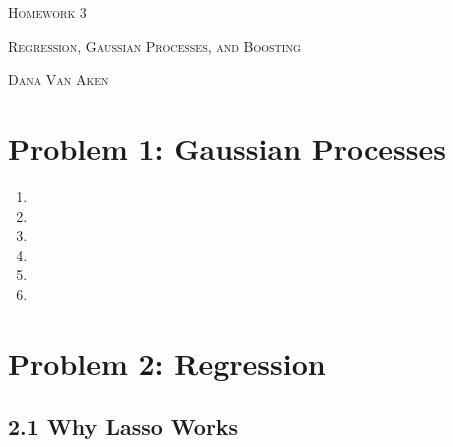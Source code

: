 \documentclass{article}
\begin{document}
\section*{}
\begin{center}
  \centerline{\textsc{\LARGE Homework 3}}
  \vspace{0.5em}
  \centerline{\textsc{Regression, Gaussian Processes, and Boosting}}
  \vspace{1em}
  \textsc{\large Dana Van Aken} \\
\end{center}

\section*{Problem 1: Gaussian Processes}

\begin{enumerate}[label=(\alph*)]
\setlength\itemsep{1em}

\item %

\item %

\item %

\item %

\item %

\item %

\end{enumerate}

\section*{Problem 2: Regression}

\subsection*{2.1 Why Lasso Works}
\end{document}
